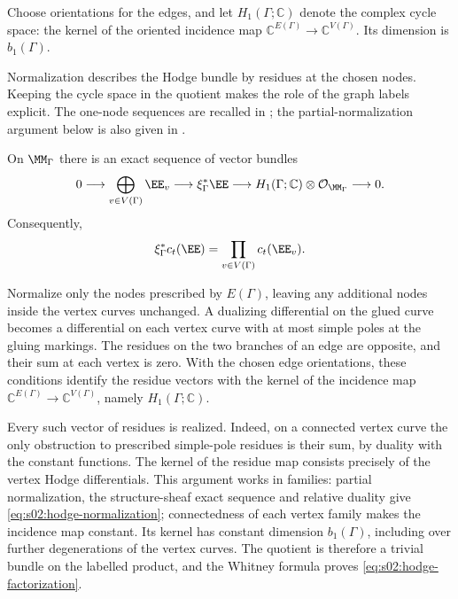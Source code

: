 Choose orientations for the edges, and let $H_1(\Gamma;\mathbb C)$
denote the complex cycle space: the kernel of the oriented incidence
map $\mathbb C^{E(\Gamma)}\to\mathbb C^{V(\Gamma)}$.  Its dimension
is $b_1(\Gamma)$.

Normalization describes the Hodge bundle by residues at the chosen
nodes.  Keeping the cycle space in the quotient makes the role of the
graph labels explicit.  The one-node sequences are recalled in
\cite[\S 1.3, (17)--(18)]{FP00}; the partial-normalization argument
below is also given in \cite[proof of Proposition 4.4, (4.2)--(4.3)]{LX26b}.

\begin{lmm}
\label{lmm:s02:hodge-normalization}
On $\MM_\Gamma$ there is an exact sequence of vector bundles
\begin{equation}
\label{eq:s02:hodge-normalization}
0\longrightarrow\bigoplus_{v\in V(\Gamma)}\EE_v
\longrightarrow\xi_\Gamma^*\EE
\longrightarrow H_1(\Gamma;\mathbb C)\otimes\mathcal O_{\MM_\Gamma}
\longrightarrow0.
\end{equation}
Consequently,
\begin{equation}
\label{eq:s02:hodge-factorization}
\xi_\Gamma^*c_t(\EE)
=\prod_{v\in V(\Gamma)}c_t(\EE_v).
\end{equation}
\end{lmm}

\begin{prf}
Normalize only the nodes prescribed by $E(\Gamma)$, leaving any
additional nodes inside the vertex curves unchanged.  A dualizing
differential on the glued curve becomes a differential on each vertex
curve with at most simple poles at the gluing markings.  The residues
on the two branches of an edge are opposite, and their sum at each
vertex is zero.  With the chosen edge orientations, these
conditions identify the residue vectors with the kernel of the
incidence map
$\mathbb C^{E(\Gamma)}\to\mathbb C^{V(\Gamma)}$, namely
$H_1(\Gamma;\mathbb C)$.

Every such vector of residues is realized.  Indeed, on a connected
vertex curve the only obstruction to prescribed simple-pole residues
is their sum, by duality with the constant functions.  The kernel of
the residue map consists precisely of the vertex Hodge differentials.
This argument works in families: partial normalization, the
structure-sheaf exact sequence and relative duality give
\eqref{eq:s02:hodge-normalization}; connectedness of each vertex
family makes the incidence map constant.  Its kernel has constant
dimension $b_1(\Gamma)$, including over further degenerations of the
vertex curves.  The quotient is therefore a trivial bundle on the
labelled product, and the Whitney formula proves
\eqref{eq:s02:hodge-factorization}.
\end{prf}

